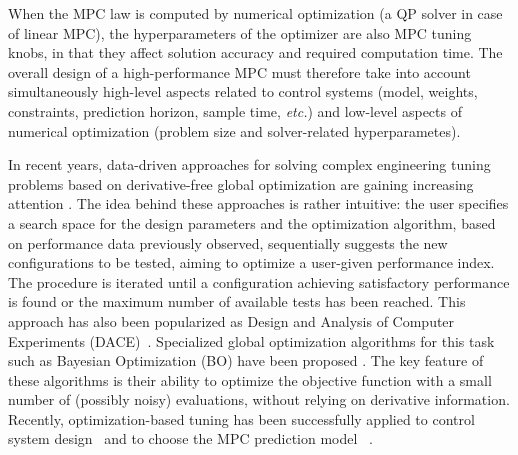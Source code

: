 \documentclass{article}
\begin{document}
When the MPC law is computed by numerical optimization (a QP solver in case of linear MPC), the hyperparameters of the optimizer are also MPC tuning knobs, in that they affect solution accuracy and required computation time. 
The overall design of a high-performance MPC must therefore take into account simultaneously high-level aspects related to control systems (model, weights, constraints, prediction horizon, sample time, \emph{etc.})  and low-level aspects of numerical optimization (problem size and solver-related hyperparametes). 

In recent years, data-driven approaches for solving complex engineering tuning problems based on derivative-free global optimization are gaining increasing attention \citep{shahriari2016taking}.
The idea behind these approaches is rather intuitive: the user specifies a search space for the design parameters and the optimization algorithm, based on performance data previously  observed, sequentially suggests the new configurations to be tested, aiming to optimize a user-given performance index. The procedure is iterated until a configuration achieving satisfactory performance is found or the maximum number of available tests has been reached.
This approach has also been popularized as Design and Analysis of Computer Experiments (DACE)~\citep{SWMW89}.
Specialized global optimization algorithms for this task such as Bayesian Optimization
(BO) have been proposed \citep{brochu2010tutorial}. The key feature of these algorithms is their
ability to optimize the objective function with a small number of (possibly noisy) evaluations, without relying on derivative information. 
Recently, optimization-based tuning has been successfully applied to control system design~\citep{roveda2019control, driess2017constrained} and  to choose the MPC prediction model ~\citep{piga2019performance, bansal2017goal}. 
\end{document}
